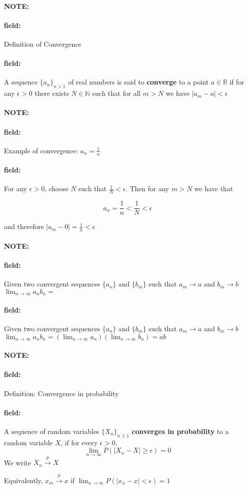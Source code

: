 \documentclass[12pt]{article}
\newenvironment{note}{\paragraph{NOTE:}}{}
\newenvironment{field}{\paragraph{field:}}{}
\begin{document}


\begin{note}
  \begin{field}
    Definition of Convergence
  \end{field}
  \begin{field}
    A sequence $\{a_n\}_{n > 1}$ of real numbers is said to \textbf{converge} to a point $a \in \mathbb{R}$ if for any $\epsilon > 0$ there exists $N \in \mathbb{N}$ such that for all $m > N $ we have $|a_m - a| < \epsilon $
  \end{field}
\end{note}

\begin{note}
  \begin{field}
    Example of convergence: $a_n = \frac{1}{n}$
  \end{field}
  \begin{field}
    For any $\epsilon > 0$, choose $N$ such that $\frac{1}{N} < \epsilon$. Then for any $m > N$ we have that

    $$a_n = \frac{1}{n} < \frac{1}{N} < \epsilon$$

    and therefore $|a_m - 0| = \frac{1}{n} < \epsilon$
  \end{field}
\end{note}


\begin{note}
  \begin{field}
    Given two convergent sequences $\{a_n\}$ and $\{b_m\}$ such that $a_m \to a$ and $b_m \to b$\\
    $\lim_{n \to \infty} a_nb_n = $
  \end{field}
  \begin{field}
    Given two convergent sequences $\{a_n\}$ and $\{b_m\}$ such that $a_m \to a$ and $b_m \to b$\\
    $\lim_{n \to \infty} a_nb_n = (\lim_{n \to \infty}a_n)(\lim_{n \to \infty}b_n) = ab$
  \end{field}
\end{note}


\begin{note}
  \begin{field}
    Definition: Convergence in probability
  \end{field}
  \begin{field}
    A sequence of random variables $\{X_n\}_{n \geq 1}$ \textbf{converges in probability } to a random variable $X$, if for every $\epsilon > 0$, $$\lim_{n \to \infty}P(|X_n - X| \geq \epsilon) = 0 $$
    We write $X_n \overset{p}{\to} X$

    Equivalently, $x_m \overset{p}{\to} x$ if $\lim_{n \to \infty}P(|x_n - x| < \epsilon) = 1$
  \end{field}
\end{note}
\end{document}
